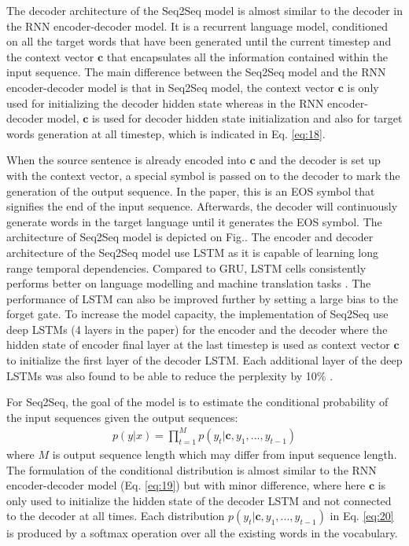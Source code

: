 \documentclass[12pt]{extarticle}
\begin{document}
\newpage %
The decoder architecture of the Seq2Seq model is almost similar to the decoder in the RNN encoder-decoder model. It is a recurrent language model, conditioned on all the target words that have been generated until the current timestep and the context vector $\textbf{c}$ that encapsulates all the information contained within the input sequence. The main difference between the Seq2Seq model and the RNN encoder-decoder model is that in Seq2Seq model, the context vector $\textbf{c}$ is only used for initializing the decoder hidden state whereas in the RNN encoder-decoder model, $\textbf{c}$ is used for decoder hidden state initialization and also for target words generation at all timestep, which is indicated in Eq. \ref{eq:18}. 

When the source sentence is already encoded into $\textbf{c}$ and the decoder is set up with the context vector, a special symbol is passed on to the decoder to mark the generation of the output sequence. In the paper, this is an EOS symbol that signifies the end of the input sequence. Afterwards, the decoder will continuously generate words in the target language until it generates the EOS symbol. The architecture of Seq2Seq model is depicted on Fig..
\newpage
The encoder and decoder architecture of the Seq2Seq model use LSTM as it is capable of learning long range temporal dependencies. Compared to GRU, LSTM cells consistently performs better on language modelling \citep{Jozefowicz:2015:EER:3045118.3045367} and machine translation tasks \citep{britz-etal-2017-massive}. The performance of LSTM can also be improved further by setting a large bias to the forget gate. To increase the model capacity, the implementation of Seq2Seq use deep LSTMs (4 layers in the paper) for the encoder and the decoder where the hidden state of encoder final layer at the last timestep is used as context vector $\textbf{c}$ to initialize the first layer of the decoder LSTM. Each additional layer of the deep LSTMs was also found to be able to reduce the perplexity by 10\% \citep{Sutskever:2014:SSL:2969033.2969173}. 

For Seq2Seq, the goal of the model is to estimate the conditional probability of the input sequences given the output sequences:
\begin{align}
p(y|x) = \prod_{t=1}^{M} p(y_{t} | \textbf{c}, y_{1},..., y_{t-1})  \label{eq:20}
\end{align}
where $M$ is output sequence length which may differ from input sequence length. The formulation of the conditional distribution is almost similar to the RNN encoder-decoder model (Eq. \ref{eq:19}) but with minor difference, where here $\textbf{c}$ is only used to initialize the hidden state of the decoder LSTM and not connected to the decoder at all times. Each distribution $p(y_{t} | \textbf{c}, y_{1},..., y_{t-1})$ in Eq. \ref{eq:20} is produced by a softmax operation over all the existing words in the vocabulary.
\end{document}
